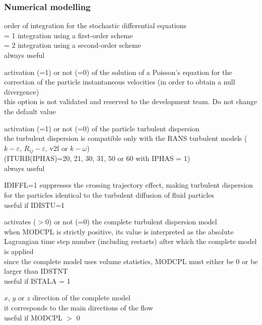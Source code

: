 \subsubsection{Numerical modelling}

{order of integration for the stochastic differential equations\\
\hspace*{1.3cm} = 1 integration using a first-order scheme\\
\hspace*{1.3cm} = 2 integration using a second-order scheme\\
always useful}

{activation (=1) or not (=0) of the solution of a Poisson's equation for
the correction of the particle instantaneous velocities (in order to obtain a
null divergence)\\
this option is not validated and reserved to the development team. Do not change
the default value}

{activation (=1) or not (=0) of the particle turbulent dispersion\\
the turbulent dispersion is compatible only with the RANS turbulent models
($k-\varepsilon$, $R_{ij}-\varepsilon$, v2f or $k-\omega$)\\
(ITURB(IPHAS)=20, 21, 30, 31, 50 or 60 with IPHAS = 1)\\
always useful}

{IDIFFL=1 suppresses the crossing trajectory effect, making turbulent dispersion
for the particles identical to the turbulent diffusion of fluid particles\\
useful if IDISTU=1}

{activates ($>$0) or not (=0) the complete turbulent dispersion model\\
when MODCPL is strictly positive, its value is interpreted as the absolute
Lagrangian time step number (including restarts) after which the complete model
is applied\\ 
since the complete model uses volume statistics, MODCPL must either be 0 or be
larger than IDSTNT\\
useful if ISTALA = 1}

{$x$, $y$ or $z$ direction of the complete model\\
it corresponds to the main directions of the flow\\
useful if MODCPL $>$ 0}

